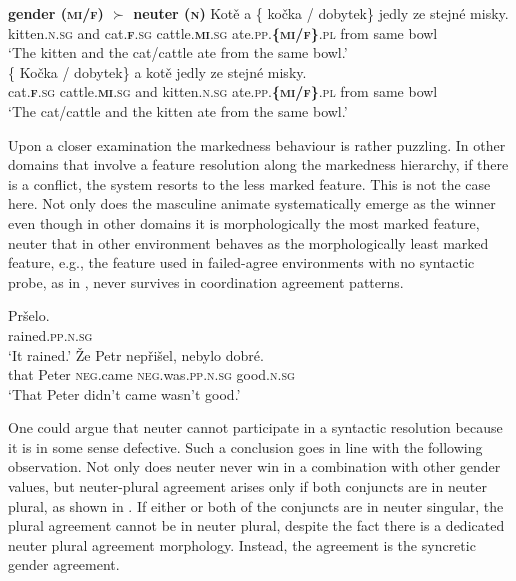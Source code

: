 \documentclass[output=paper,
modfonts
newtxmath,
hidelinks
]{langscibook}
\begin{document}
\ea\label{baseline-inanim} \textbf{gender ({\textsc{mi}/\textsc{f}}) $\succ$ neuter (\textsc{n})}
\ea\gll Kotě a \{\hspace{-2pt} kočka / dobytek\} jedly ze stejné misky.\\
kitten.\textsc{n.sg} and {} cat.\textsc{\textbf{f}.sg} {} cattle.\textsc{\textbf{mi}.sg} ate.\textsc{pp.\textbf{\{mi/f\}}.pl} from same bowl\\
\glt `The kitten and the cat/cattle ate from the same bowl.'\\\hfill {}\smallskip
\ex\gll \{\hspace{-2pt} Kočka / dobytek\} a kotě jedly ze stejné misky.\\
{} cat.\textsc{\textbf{f}.sg} {} cattle.\textsc{\textbf{mi}.sg} and kitten.\textsc{n.sg} ate.\textsc{pp.\textbf{\{mi/f\}}.pl} from same bowl\\
\glt `The cat/cattle and the kitten ate from the same bowl.'\\\hfill {}
\z\z

\noindent Upon a closer examination the markedness behaviour is rather puzzling. In other domains that involve a feature resolution along the markedness hierarchy, if there is a conflict, the system resorts to the less marked feature. This is not the case here. Not only does the masculine animate systematically emerge as the winner even though in other domains it is morphologically the most marked feature, neuter that in other environment behaves as the morphologically least marked feature, e.g., the feature used in failed-agree environments with no syntactic probe, as in , never survives in coordination agreement patterns.

\ea\label{def-neuter}
\ea\gll Pršelo.\\
rained.\textsc{pp.n.sg}\\
\glt `It rained.'
\ex\gll Že Petr nepřišel, nebylo dobré.\\
that Peter \textsc{neg}.came \textsc{neg}.was.\textsc{pp.n.sg} good.\textsc{n.sg}\\
\glt `That Peter didn't came wasn't good.'
\z\z

\noindent One could argue that neuter cannot participate in a syntactic resolution because it is in some sense defective. Such a conclusion goes in line with the following observation. Not only does neuter never win in a combination with other gender values, but neuter-plural agreement arises only if both conjuncts are in neuter plural, as shown in . If either or both of the conjuncts are in neuter singular, the plural agreement cannot be in neuter plural, despite the fact there is a dedicated neuter plural agreement morphology. Instead, the agreement is the syncretic gender agreement. 
\end{document}
